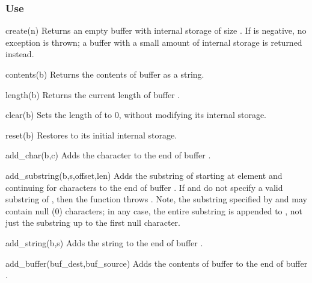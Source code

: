 \subsubsection*{Use}

\begin{defun}{create}{(n)}
Returns an empty buffer with internal storage of size .  If
 is negative, no exception is thrown; a buffer with a small
amount of internal storage is returned instead.
\end{defun}

\begin{defun}{contents}{(b)}
Returns the contents of buffer  as a string.
\end{defun}

\begin{defun}{length}{(b)}
Returns the current length of buffer .
\end{defun}

\begin{defun}{clear}{(b)}
Sets the length of  to 0, without modifying its internal storage.
\end{defun}

\begin{defun}{reset}{(b)}
Restores  to its initial internal storage.
\end{defun}

\begin{defun}{add_char}{(b,c)}
Adds the character  to the end of buffer .
\end{defun}

\begin{defun}{add_substring}{(b,s,offset,len)}
Adds the substring of  starting at element  and
continuing for  characters to the end of buffer .  If
 and  do not specify a valid substring of ,
then the function throws .
Note, the substring specified by  and  may contain
null (0) characters; in any case, the entire substring is appended to
, not just the substring up to the first null character.
\end{defun}

\begin{defun}{add_string}{(b,s)}
Adds the string  to the end of buffer .
\end{defun}

\begin{defun}{add_buffer}{(buf_dest,buf_source)}
Adds the contents of buffer  to the end of buffer
.
\end{defun}

